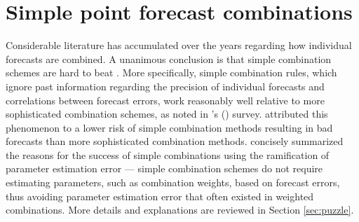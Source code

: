 \documentclass[11pt]{article}
\def\citeapos#1{\citeauthor{#1}'s (\citeyear{#1})}
\begin{document}
\section{Simple point forecast combinations}
\label{sec:simple_comb}

Considerable literature has accumulated over the years regarding how individual forecasts are combined. A unanimous conclusion is that simple combination schemes are hard to beat \citep{Kang1986-kq,Clemen1989-fb,Fischer1999-kz,Stock2004-rq,Lichtendahl2020-ut}. More specifically, simple combination rules, which ignore past information regarding the precision of individual forecasts and correlations between forecast errors, work reasonably well relative to more sophisticated combination schemes, as noted in \citeapos{Clemen1989-fb} survey. \citet{Lichtendahl2020-ut} attributed this phenomenon to a lower risk of simple combination methods resulting in bad forecasts than more sophisticated combination methods. \citet{Timmermann2006-en} concisely summarized the reasons for the success of simple combinations using the ramification of parameter estimation error --- simple combination schemes do not require estimating parameters, such as combination weights, based on forecast errors, thus avoiding parameter estimation error that often existed in weighted combinations. More details and explanations are reviewed in Section \ref{sec:puzzle}.
\end{document}
